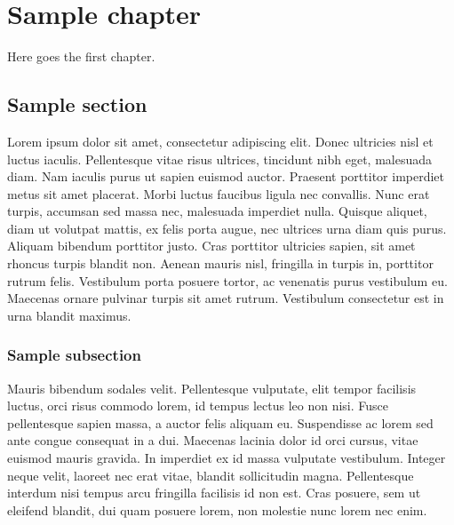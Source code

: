 \documentclass{lecnotes}
\begin{document}
	\chapter{Sample chapter}
	Here goes the first chapter.
	\section{Sample section}
	Lorem ipsum dolor sit amet, consectetur adipiscing elit. Donec ultricies nisl et luctus iaculis. Pellentesque vitae risus ultrices, tincidunt nibh eget, malesuada diam. Nam iaculis purus ut sapien euismod auctor. Praesent porttitor imperdiet metus sit amet placerat. Morbi luctus faucibus ligula nec convallis. Nunc erat turpis, accumsan sed massa nec, malesuada imperdiet nulla. Quisque aliquet, diam ut volutpat mattis, ex felis porta augue, nec ultrices urna diam quis purus. Aliquam bibendum porttitor justo. Cras porttitor ultricies sapien, sit amet rhoncus turpis blandit non. Aenean mauris nisl, fringilla in turpis in, porttitor rutrum felis. Vestibulum porta posuere tortor, ac venenatis purus vestibulum eu. Maecenas ornare pulvinar turpis sit amet rutrum. Vestibulum consectetur est in urna blandit maximus.
	
	\subsection{Sample subsection}
	
	Mauris bibendum sodales velit. Pellentesque vulputate, elit tempor facilisis luctus, orci risus commodo lorem, id tempus lectus leo non nisi. Fusce pellentesque sapien massa, a auctor felis aliquam eu. Suspendisse ac lorem sed ante congue consequat in a dui. Maecenas lacinia dolor id orci cursus, vitae euismod mauris gravida. In imperdiet ex id massa vulputate vestibulum. Integer neque velit, laoreet nec erat vitae, blandit sollicitudin magna. Pellentesque interdum nisi tempus arcu fringilla facilisis id non est. Cras posuere, sem ut eleifend blandit, dui quam posuere lorem, non molestie nunc lorem nec enim.
	
\end{document}
